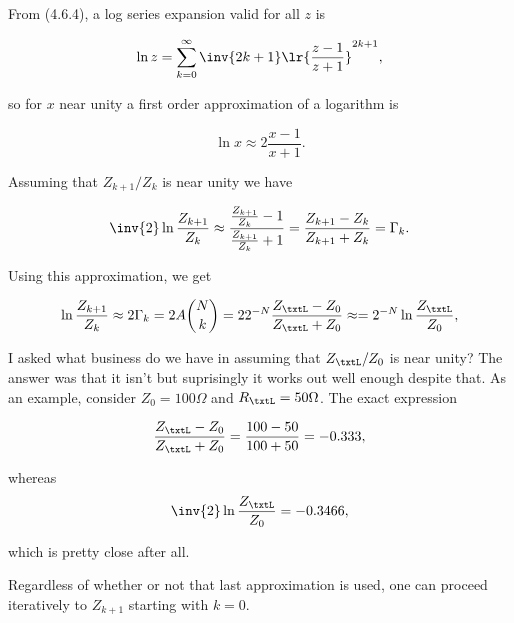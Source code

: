 From \citep{NIST:DLMF} (4.6.4), a log series expansion valid for all \( z \) is

\begin{equation}\label{eqn:uwavesDeck7MultisectionTransformersCore:320}
\ln z = \sum_{k = 0}^\infty \inv{2 k + 1} \lr{ \frac{ z - 1 }{z + 1} }^{2k + 1},
\end{equation}

so for \( x \) near unity a first order approximation of a logarithm is

\begin{equation}\label{eqn:uwavesDeck7MultisectionTransformersCore:340}
\ln x \approx 2 \frac{x -1}{x+1}.
\end{equation}

Assuming that \( Z_{k+1}/Z_k \) is near unity we have

\begin{dmath}\label{eqn:uwavesDeck7MultisectionTransformersCore:360}
\inv{2} \ln \frac{Z_{k+1}}{Z_k} 
\approx
\frac{ \frac{Z_{k+1}}{Z_k} - 1 }{\frac{Z_{k+1}}{Z_k} + 1}
=
\frac{ Z_{k+1} - Z_k }{Z_{k+1} + Z_k}
=
\Gamma_k.
\end{dmath}

Using this approximation, we get

\begin{dmath}\label{eqn:uwavesDeck7MultisectionTransformersCore:380}
\ln \frac{Z_{k+1}}{Z_k}
\approx
2 \Gamma_k 
= 2 A \binom{N}{k}
= 2 2^{-N} \frac{Z_\txtL - Z_0}{Z_\txtL + Z_0}
\approx
= 2^{-N} \ln \frac{Z_\txtL}{Z_0},
\end{dmath}

I asked what business do we have in assuming that \( Z_\txtL/Z_0 \) is near unity?  The answer was that it isn't but suprisingly it works out well enough despite that.  As an example, consider \( Z_0 = 100 \Omega \) and \( R_\txtL = 50 \Omega \).  The exact expression

\begin{dmath}\label{eqn:uwavesDeck7MultisectionTransformersCore:880}
\frac{Z_\txtL - Z_0}{Z_\txtL + Z_0} 
= \frac{100-50}{100+50} 
= -0.333,
\end{dmath}

whereas
\begin{dmath}\label{eqn:uwavesDeck7MultisectionTransformersCore:900}
\inv{2} \ln \frac{Z_\txtL}{Z_0} = -0.3466,
\end{dmath}

which is pretty close after all.

Regardless of whether or not that last approximation is used, one can proceed iteratively to \( Z_{k+1} \) starting with \( k = 0 \).

